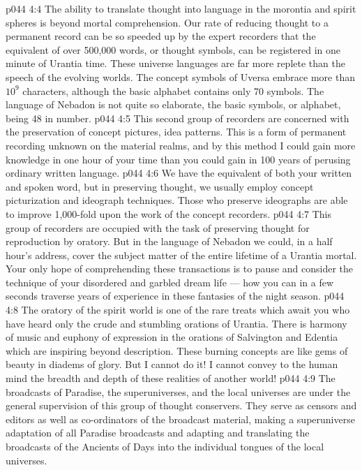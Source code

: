 \vs p044 4:4 The ability to translate thought into language in the morontia and spirit spheres is beyond mortal comprehension. Our rate of reducing thought to a permanent record can be so speeded up by the expert recorders that the equivalent of over 500,000 words, or thought symbols, can be registered in one minute of Urantia time. These universe languages are far more replete than the speech of the evolving worlds. The concept symbols of Uversa embrace more than $10^{9}$ characters, although the basic alphabet contains only 70 symbols. The language of Nebadon is not quite so elaborate, the basic symbols, or alphabet, being 48 in number.
\vs p044 4:5 \bibnobreakspace {} This second group of recorders are concerned with the preservation of concept pictures, idea patterns. This is a form of permanent recording unknown on the material realms, and by this method I could gain more knowledge in one hour of your time than you could gain in 100 years of perusing ordinary written language.
\vs p044 4:6 \bibnobreakspace {} We have the equivalent of both your written and spoken word, but in preserving thought, we usually employ concept picturization and ideograph techniques. Those who preserve ideographs are able to improve 1,000\hyp{}fold upon the work of the concept recorders.
\vs p044 4:7 \bibnobreakspace {} This group of recorders are occupied with the task of preserving thought for reproduction by oratory. But in the language of Nebadon we could, in a half hour’s address, cover the subject matter of the entire lifetime of a Urantia mortal. Your only hope of comprehending these transactions is to pause and consider the technique of your disordered and garbled dream life --- how you can in a few seconds traverse years of experience in these fantasies of the night season.
\vs p044 4:8 The oratory of the spirit world is one of the rare treats which await you who have heard only the crude and stumbling orations of Urantia. There is harmony of music and euphony of expression in the orations of Salvington and Edentia which are inspiring beyond description. These burning concepts are like gems of beauty in diadems of glory. But I cannot do it! I cannot convey to the human mind the breadth and depth of these realities of another world!
\vs p044 4:9 \bibnobreakspace {} The broadcasts of Paradise, the superuniverses, and the local universes are under the general supervision of this group of thought conservers. They serve as censors and editors as well as co\hyp{}ordinators of the broadcast material, making a superuniverse adaptation of all Paradise broadcasts and adapting and translating the broadcasts of the Ancients of Days into the individual tongues of the local universes.
